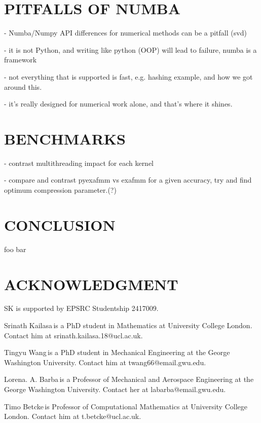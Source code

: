 \documentclass{IEEEcsmag}
\begin{document}
\section{PITFALLS OF NUMBA}

- Numba/Numpy API differences for numerical methods can be a pitfall (svd)

- it is not Python, and writing like python (OOP) will lead to failure, numba is a framework

- not everything that is supported is fast, e.g. hashing example, and how we got around this.

- it's really designed for numerical work alone, and that's where it shines.

\section{BENCHMARKS}

- contrast multithreading impact for each kernel

- compare and contrast pyexafmm vs exafmm for a given accuracy, try and find optimum compression parameter.(?)

\section{CONCLUSION}

foo bar

\section{ACKNOWLEDGMENT}

SK is supported by EPSRC Studentship 2417009.

% 

% 

\begin{IEEEbiography}{Srinath Kailasa}{\,}is a PhD student in Mathematics at University College London. Contact him at srinath.kailasa.18@ucl.ac.uk.
\end{IEEEbiography}

\begin{IEEEbiography}{Tingyu Wang}{\,}is a PhD student in Mechanical Engineering at the George Washington University. Contact him at twang66@email.gwu.edu.
\end{IEEEbiography}

\begin{IEEEbiography}{Lorena. A. Barba}{\,}is a Professor of Mechanical and Aerospace Engineering at the George Washington University.  Contact her at labarba@email.gwu.edu.
\end{IEEEbiography}

\begin{IEEEbiography}{Timo Betcke}{\,}is Professor of Computational Mathematics at University College London. Contact him at t.betcke@ucl.ac.uk.
\end{IEEEbiography}
\end{document}
